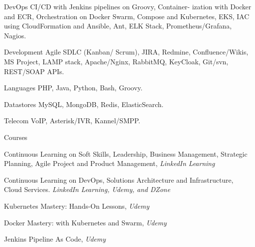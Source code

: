
\begin{cvdesc}

  \cvdesch
    {DevOps} %
    {CI/CD with Jenkins pipelines on Groovy, Container- ization with Docker and ECR, Orchestration on Docker Swarm, Compose and Kubernetes, EKS, IAC using CloudFormation and Ansible, Ant, ELK Stack, Prometheus/Grafana, Nagios.} %

  \cvdesch
    {Development} %
    {Agile SDLC (Kanban/ Scrum), JIRA, Redmine, Confluence/Wikis, MS Project, LAMP stack, Apache/Nginx, RabbitMQ, KeyCloak, Git/svn, REST/SOAP APIs.} %

  \cvdesch
    {Languages} %
    {PHP, Java, Python, Bash, Groovy.} %

  \cvdesch
    {Datastores} %
    {MySQL, MongoDB, Redis, ElasticSearch.} %

  \cvdesch
    {Telecom} %
    {VoIP, Asterisk/IVR, Kannel/SMPP.} %

\end{cvdesc}

\begin{cvdesc}
  \cvdescv
    {Courses}
    {
      \begin{cvitems}
      \item {Continuous Learning on Soft Skills, Leadership, Business Management, Strategic Planning, Agile Project and Product Management, \textit{LinkedIn Learning}}
      \item {Continuous Learning on DevOps, Solutions Architecture and Infrastructure, Cloud Services. \textit{LinkedIn Learning, Udemy, and DZone}}
      \item {Kubernetes Mastery: Hands-On Lessons, \textit{Udemy}}
      \item {Docker Mastery: with Kubernetes and Swarm, \textit{Udemy}}
      \item {Jenkins Pipeline As Code, \textit{Udemy}}
      \end{cvitems}
    }

\end{cvdesc}
